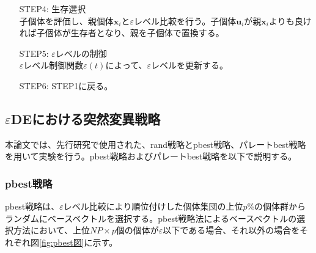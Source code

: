 \documentclass[a4paper,12pt]{jsreport}
\begin{document}
\begin{enumerate}
\item[STEP4:]\mbox{生存選択}\\ 
子個体を評価し、親個体$\bm{x}_i$と$\varepsilon$レベル比較を行う。子個体$\bm{u}_i$が親$\bm{x}_i$よりも良ければ子個体が生存者となり、親を子個体で置換する。

\item[STEP5:]\mbox{$\varepsilon$レベルの制御}\\ 
$\varepsilon$レベル制御関数$\varepsilon(t)$によって、$\varepsilon$レベルを更新する。

\item[STEP6:]\mbox{STEP1に戻る。}\\ 

\end{enumerate}

\subsection{$\varepsilon$DEにおける突然変異戦略}
本論文では、先行研究\cite{先行研究}で使用された、rand戦略とpbest戦略、パレートbest戦略を用いて実験を行う。pbest戦略およびパレートbest戦略を以下で説明する。
\subsubsection{pbest戦略}
pbest戦略は、$\varepsilon$レベル比較により順位付けした個体集団の上位$p$\%の個体群からランダムにベースベクトルを選択する。pbest戦略法によるベースベクトルの選択方法において、上位$NP \times p$個の個体が$\varepsilon$以下である場合、それ以外の場合をそれぞれ図\ref{fig:pbest図}に示す。
\end{document}
